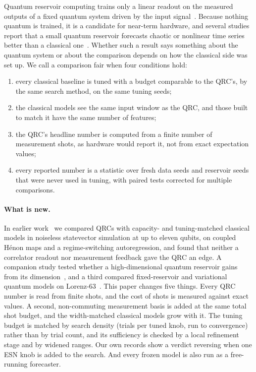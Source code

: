 \documentclass[11pt,a4paper]{article}
\begin{document}
Quantum reservoir computing trains only a linear readout on the measured outputs of a fixed quantum
system driven by the input signal~\cite{fujii2017}. Because nothing quantum is trained, it is a
candidate for near-term hardware, and several studies report that a small quantum reservoir
forecasts chaotic or nonlinear time series better than a classical one~\cite{ahmed2024,
kobayashi2024,nguyen2026}. Whether such a result says something about the quantum system or about
the comparison depends on how the classical side was set up. We call a comparison fair when four
conditions hold:
\begin{enumerate}
\item every classical baseline is tuned with a budget comparable to the QRC's, by the same search
  method, on the same tuning seeds;
\item the classical models see the same input window as the QRC, and those built to match it have
  the same number of features;
\item the QRC's headline number is computed from a finite number of measurement shots, as hardware
  would report it, not from exact expectation values;
\item every reported number is a statistic over fresh data seeds and reservoir seeds that were never
  used in tuning, with paired tests corrected for multiple comparisons.
\end{enumerate}

\paragraph{What is new.} In earlier work~\cite{pandey2026cartography} we compared QRCs with
capacity- and tuning-matched classical models in noiseless statevector simulation at up to eleven
qubits, on coupled H\'enon maps and a regime-switching autoregression, and found that neither a
correlator readout nor measurement feedback gave the QRC an edge. A companion study tested whether a
high-dimensional quantum reservoir gains from its dimension~\cite{pandey2026qra}, and a third
compared fixed-reservoir and variational quantum models on Lorenz-63~\cite{pandey2026qpinn}. This
paper changes five things. Every QRC number is read from finite shots, and the cost of shots is
measured against exact values. A second, non-commuting measurement basis is added at the same total
shot budget, and the width-matched classical models grow with it. The tuning budget is matched by
search density (trials per tuned knob, run to convergence) rather than by trial count, and its
sufficiency is checked by a local refinement stage and by widened ranges. Our own records show a
verdict reversing when one ESN knob is added to the search. And every frozen model is also run as a
free-running forecaster.
\end{document}
